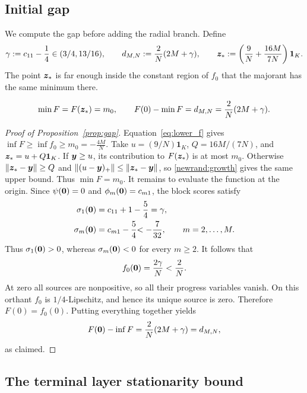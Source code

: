 \subsection{Initial gap}
\label{sec:gap}

We compute the gap before adding the radial branch. Define
\[
 \gamma:=c_{11}-\frac14\in(3/4,13/16),\qquad
 d_{M,N}:=\frac2N(2M+\gamma),\qquad
 \bm{z}_*:=\left(\frac9N+\frac{16M}{7N}\right)\mathbf1_K.
\]
The point $\bm{z}_*$ is far enough inside the constant region of
$f_0$ that the majorant has the same minimum there.
\begin{proposition}
\label{prop:gap}
\label{newrand:gap}
{
\begin{equation}
 \min F=F(\bm{z}_*)=m_0,\qquad
 F(0)-\min F=d_{M,N}=\frac2N(2M+\gamma).
 \label{newrand:exact-gap}
\end{equation}}
\end{proposition}

\begin{proof}[Proof of Proposition~\ref{prop:gap}]
Equation~\eqref{eq:lower_f} gives
$
 {\inf F\geq\inf f_0\geq m_0=-\tfrac{4M}{N}}.
$
{Take $u=(9/N)\mathbf1_K$, $Q=16M/(7N)$, and $\bm{z}_*=u+Q\mathbf1_K$.
If $\bm{y}\ge u$, its contribution to $F(\bm{z}_*)$ is at most $m_0$.
Otherwise $\|\bm{z}_*-\bm{y}\|\ge Q$ and
$\|(u-\bm{y})_+\|\le\|\bm{z}_*-\bm{y}\|$, so
\eqref{newrand:growth} gives the same upper bound. Thus $\min F=m_0$.}
It remains to evaluate the function at the origin. Since
$
 \psi({\mathbf 0})=0$ and $\phi_{m}({\mathbf 0})=c_{{m}1}$,
the block scores satisfy
\begin{align*}
 \sigma_1({\mathbf 0})
 &=
 c_{{1}1}+1-\frac54
 =
 {\gamma},\\
 \sigma_m({\mathbf 0})
 &=
 c_{{m}1}-\frac54
 {<-\frac7{32}},
 \qquad m=2,\ldots,M.
\end{align*}
Thus \(\sigma_1({\mathbf 0})>0\), whereas \(\sigma_m({\mathbf 0})<0\) for every
\(m\geq2\). It follows
that
\[
 {f_0}({\mathbf 0})
 =
 {\frac{2\gamma}{N}}
 <
 \frac2N.
\]
{At zero all sources are nonpositive, so all their progress variables
vanish. On this orthant $f_0$ is $1/4$-Lipschitz, and hence its
unique source is zero. Therefore $F(0)=f_0(0)$.}
Putting everything together yields
\[
 {F({\mathbf 0})-\inf F=\frac2N(2M+\gamma)=d_{M,N}},
\]
{as claimed.}
\end{proof}

\subsection{The terminal layer stationarity bound}
\label{subsec:terminal-stationarity}


